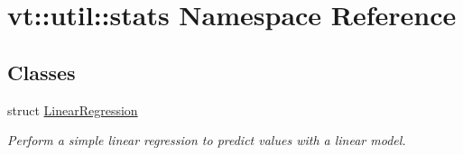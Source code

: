 \hypertarget{namespacevt_1_1util_1_1stats}{}\section{vt\+:\+:util\+:\+:stats Namespace Reference}
\label{namespacevt_1_1util_1_1stats}
\subsection*{Classes}
\begin{DoxyCompactItemize}
\item 
struct \hyperlink{structvt_1_1util_1_1stats_1_1_linear_regression}{Linear\+Regression}
\begin{DoxyCompactList}\small\item\em Perform a simple linear regression to predict values with a linear model. \end{DoxyCompactList}\end{DoxyCompactItemize}

